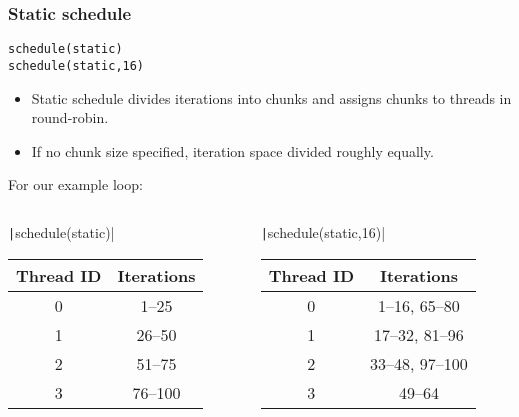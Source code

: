 \documentclass{beamer}
\begin{document}
\begin{frame}[fragile]
\frametitle{Static schedule}
\begin{verbatim}
schedule(static)
schedule(static,16)
\end{verbatim}

\begin{itemize}
\item Static schedule divides iterations into chunks and assigns chunks to threads in round-robin.
\item If no chunk size specified, iteration space divided roughly equally.
\end{itemize}
For our example loop:
\begin{columns}
\begin{column}{0.5\textwidth}
  \texttt|schedule(static)|
  \begin{tabular}{cc}
  \toprule
  Thread ID & Iterations \\
  \midrule
  0 &  1--25 \\
  1 & 26--50 \\
  2 & 51--75 \\
  3 & 76--100 \\
  \bottomrule
  \end{tabular}
\end{column}

\begin{column}{0.5\textwidth}
  \texttt|schedule(static,16)|
  \begin{tabular}{cc}
  \toprule
  Thread ID & Iterations \\
  \midrule
  0 &  1--16, 65--80 \\
  1 & 17--32, 81--96 \\
  2 & 33--48, 97--100 \\
  3 & 49--64 \\
  \bottomrule
  \end{tabular}
\end{column}
\end{columns}

\end{frame}
\end{document}
